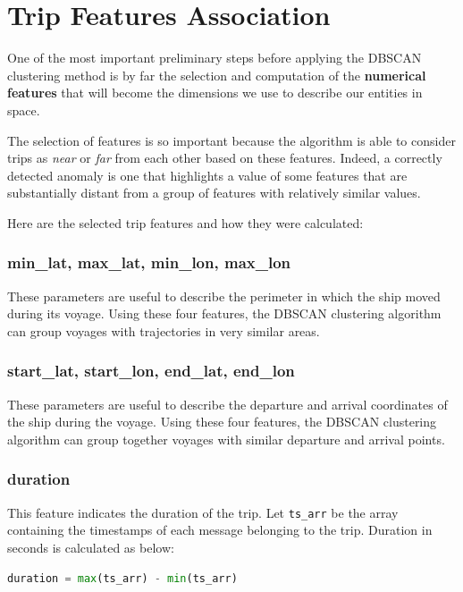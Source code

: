 \section{Trip Features Association}
    One of the most important preliminary steps before applying the DBSCAN clustering method is by far the selection and computation of the \textbf{numerical features} that will become the dimensions we use to describe our entities in space.
     
    The selection of features is so important because the algorithm is able to consider trips as \textit{near} or \textit{far} from each other based on these features. Indeed, a correctly detected anomaly is one that highlights a value of some features that are substantially distant from a group of features with relatively similar values.
    
    Here are the selected trip features and how they were calculated:
    
    \subsubsection{min\_lat, max\_lat, min\_lon, max\_lon}
        These parameters are useful to describe the perimeter in which the ship moved during its voyage. Using these four features, the DBSCAN clustering algorithm can group voyages with trajectories in very similar areas.
    
    \subsubsection{start\_lat, start\_lon, end\_lat, end\_lon}
        These parameters are useful to describe the departure and arrival coordinates of the ship during the voyage. Using these four features, the DBSCAN clustering algorithm can group together voyages with similar departure and arrival points.
    
    \subsubsection{duration}
    
        This feature indicates the duration of the trip. Let \verb|ts_arr| be the array containing the timestamps of each message belonging to the trip. Duration in seconds is calculated as below:
        
        \begin{lstlisting}[language=Python, frame=none]
duration = max(ts_arr) - min(ts_arr)
        \end{lstlisting}
        
